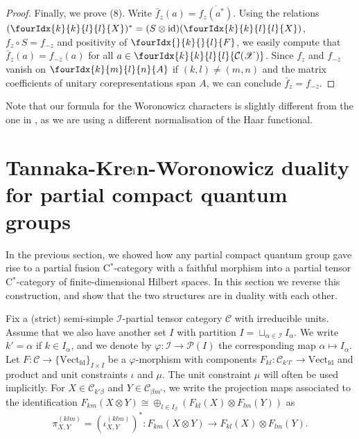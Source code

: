 \documentclass[10pt]{article}
\DeclareMathOperator{\fin}{\mathrm{fd}}
\DeclareMathOperator{\id}{id}
\newcommand{\CatC}{\mathcal{C}}
\newcommand{\CatCC}{\mathscr{C}}
\newcommand{\Vect}{\mathrm{Vect}}
\newcommand{\Gr}[5]{\fourIdx{#2}{#4}{#3}{#5}{#1}}%
\theoremstyle{definition}
\numberwithin{equation}{section}
\begin{document}
\begin{proof}
     Finally, we prove
     (8).  Write
     $\bar{f}_z(a) = \overline{f_z(a^*)}$. Using the relations $
     (\Gr{X}{k}{l}{k}{l})^{*}=(S \otimes \id)(\Gr{X}{k}{l}{k}{l})$,
     $f_{z} \circ S=f_{-z}$  and
     positivity of $\Gr{F}{}{}{k}{l}$, we easily compute that $\bar{f}_z(a) = f_{-\overline{z}}(a)$ for all $a\in
\Gr{\mathcal{C}(\mathscr{X})}{k}{l}{k}{l}$. Since $f_{z}$ and
$f_{-\overline{z}}$ vanish on $\Gr{A}{k}{l}{m}{n}$ if $(k,l)\neq
(m,n)$ and the matrix coefficients of unitary 
corepresentations span $A$, we can conclude $\bar{f}_{z}=f_{-\overline{z}}$.
\end{proof}

Note that our formula for the Woronowicz characters is slightly different from the one in \cite{Hay1}, as we are using a different normalisation of the Haar functional.


\section{Tannaka-Kre$\breve{\textrm{\i}}$n-Woronowicz duality for partial compact quantum groups}

In the previous section, we showed how any partial compact quantum group gave rise to a partial fusion C$^*$-category with a faithful morphism into a partial tensor C$^*$-category of finite-dimensional Hilbert spaces. In this section we reverse this construction, and show that the two structures are in duality with each other. 

Fix a (strict) semi-simple $\mathscr{I}$-partial tensor category $\CatCC$ with irreducible units. Assume that we also have another set $I$ with partition $I = \sqcup_{\alpha\in \mathscr{I}} I_{\alpha}$. We write $k' = \alpha$ if $k\in I_{\alpha}$, and we denote by $\varphi: \mathscr{I}\rightarrow \mathscr{P}(I)$ the corresponding map $\alpha \mapsto I_{\alpha}$.  Let $F: \CatCC\rightarrow \{\Vect_{\fin}\}_{I\times I}$ be a $\varphi$-morphism with components $F_{kl}:\CatCC_{k'l'}\rightarrow \Vect_{\fin}$ and product and unit constraints $\iota$ and $\mu$. The unit constraint $\mu$ will often be used implicitly. For $X\in \CatC_{k'\beta}$ and $Y\in \CatC_{\beta m'}$, we write the projection maps associated to the identification $F_{km}(X\otimes Y)\cong \oplus_{l\in I_\beta} \left(F_{kl}(X)\otimes F_{lm}(Y)\right)$ as \[\pi^{(klm)}_{X,Y}=(\iota^{(klm)}_{X,Y})^{*}:F_{km}(X\otimes Y) \rightarrow F_{kl}(X)\otimes F_{lm}(Y).\]
\end{document}
